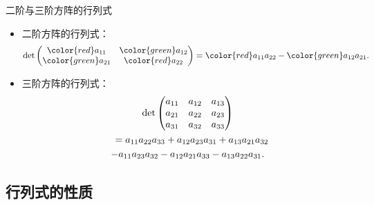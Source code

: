 
\begin{frame}

\begin{block}{二阶与三阶方阵的行列式}
\begin{itemize}
\item<2-> 二阶方阵的行列式：
$$\det \begin{pmatrix} {\color{red}a_{11}} & {\color{green}a_{12}} \\ {\color{green}a_{21}} & {\color{red}a_{22}} \end{pmatrix} = {\color{red}a_{11}a_{22}} - {\color{green}a_{12}a_{21}}.$$
\item<3-> 三阶方阵的行列式：
\begin{multline*}
\det \begin{pmatrix} a_{11} & a_{12} & a_{13} \\ a_{21} & a_{22} & a_{23} \\ a_{31} & a_{32} & a_{33} \end{pmatrix} \\
\shoveleft{= a_{11}a_{22}a_{33} + a_{12}a_{23}a_{31} + a_{13}a_{21}a_{32}} \\
- a_{11}a_{23}a_{32} - a_{12}a_{21}a_{33} - a_{13}a_{22}a_{31}.
\end{multline*}
\end{itemize}
\end{block}

\end{frame}


\subsection{行列式的性质}


